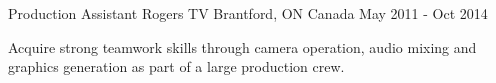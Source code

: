 \begin{cventries}

\cventry
{Production Assistant} %
{Rogers TV} %
{Brantford, ON Canada} %
{May 2011 - Oct 2014} %
{ %
	\begin{cvitems}
		\item {Acquire strong teamwork skills through camera operation, audio 
		mixing and graphics generation as part of a large production crew.}
	\end{cvitems} 
}


\end{cventries}